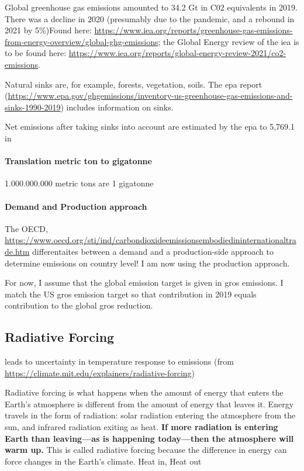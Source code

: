 Global greenhouse gas emissions amounted to 34.2 Gt in C02 equivalents in 2019. There was a decline in 2020 (presumably due to the pandemic, and a rebound in 2021 by 5\%)Found here: \url{https://www.iea.org/reports/greenhouse-gas-emissions-from-energy-overview/global-ghg-emissions}; the Global Energy review of the iea is to  be found here: \url{https://www.iea.org/reports/global-energy-review-2021/co2-emissions}.

Natural sinks are, for example, forests, vegetation, soils. 
The epa report (\url{https://www.epa.gov/ghgemissions/inventory-us-greenhouse-gas-emissions-and-sinks-1990-2019}) includes information on sinks. 

Net emissions after taking sinks into account are estimated by the epa to 5,769.1 in 
\paragraph{Translation metric ton to gigatonne}
1.000.000.000 metric tons are 1 gigatonne 

\paragraph{Demand and Production approach}
The OECD, \url{https://www.oecd.org/sti/ind/carbondioxideemissionsembodiedininternationaltrade.htm} differentaites between a demand and a production-side approach to determine emissions on country level! I am now using the production approach. 

For now, I assume that the global emission target is given in gros emissions. I match the US gros emission target so that contribution in 2019 equals contribution to the global gros reduction. 

\subsection{Radiative Forcing}
\ar  leads to uncertainty in temperature response to emissions
(from \url{https://climate.mit.edu/explainers/radiative-forcing})

Radiative forcing is what happens when the amount of energy that enters the Earth’s atmosphere is different from the amount of energy that leaves it. Energy travels in the form of radiation: solar radiation entering the atmosphere from the sun, and infrared radiation exiting as heat. \textbf{If more radiation is entering Earth than leaving—as is happening today—then the atmosphere will warm up.} This is called radiative forcing because the difference in energy can force changes in the Earth’s climate.
Heat in, Heat out

